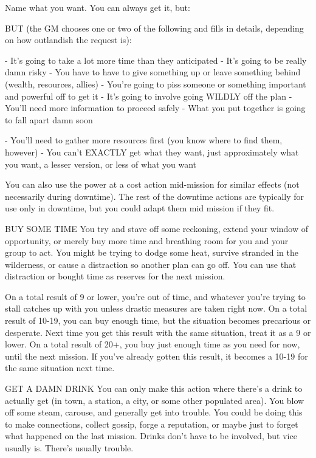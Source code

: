 Name what you want. You can always get it, but:

BUT (the GM chooses one or two of the following and fills in details, depending on how
outlandish the request is):

    -    It’s going to take a lot more time than they anticipated
    -    It’s going to be really damn risky
    -    You have to have to give something up or leave something behind (wealth, resources,
         allies)
    -    You’re going to piss someone or something important and powerful off to get it
    -    It’s going to involve going WILDLY off the plan
    -    You’ll need more information to proceed safely
    -    What you put together is going to fall apart damn soon




    -    You’ll need to gather more resources first (you know where to find them, however)
    -    You can’t EXACTLY get what they want, just approximately what you want, a lesser
         version, or less of what you want


You can also use the power at a cost action mid-mission for similar effects (not necessarily
during downtime). The rest of the downtime actions are typically for use only in downtime, but
you could adapt them mid mission if they fit.


BUY SOME TIME
You try and stave off some reckoning, extend your window of opportunity, or merely buy more
time and breathing room for you and your group to act. You might be trying to dodge some heat,
survive stranded in the wilderness, or cause a distraction so another plan can go off. You can use
that distraction or bought time as reserves for the next mission.

On a total result of 9 or lower, you’re out of time, and whatever you’re trying to stall catches up
with you unless drastic measures are taken right now.
On a total result of 10-19, you can buy enough time, but the situation becomes precarious or
desperate. Next time you get this result with the same situation, treat it as a 9 or lower.
On a total result of 20+, you buy just enough time as you need for now, until the next mission. If
you’ve already gotten this result, it becomes a 10-19 for the same situation next time.

GET A DAMN DRINK
You can only make this action where there’s a drink to actually get (in town, a station, a city, or
some other populated area). You blow off some steam, carouse, and generally get into trouble.
You could be doing this to make connections, collect gossip, forge a reputation, or maybe just to
forget what happened on the last mission. Drinks don’t have to be involved, but vice usually is.
There’s usually trouble.

